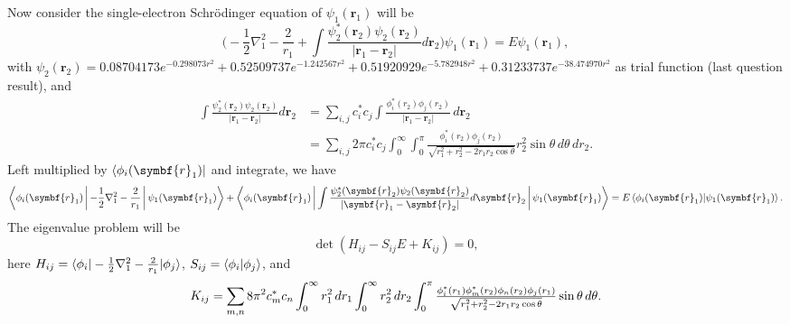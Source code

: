 \documentclass[12pt]{article}
\begin{document}
Now consider the single-electron
Schr\"{o}dinger equation of $\psi_1(\symbf{r}_1)$ will be
\begin{equation}
    \Big(- \frac{1}{2}\nabla_1^2 - \frac{2}{r_1}
    + \int \frac{\psi_2^\ast(\symbf{r}_2)\psi_2(\symbf{r}_2)}{\lvert \symbf{r}_1 -
        \symbf{r}_2 \rvert} d\symbf{r}_2 \Big) \psi_1(\symbf{r}_1) = E \psi_1 (\symbf{r}_1),
\end{equation}
with $\psi_2(\symbf{r}_2) = 0.08704173 e^{-0.298073 r^2}
    + 0.52509737 e^{-1.242567 r^2}
    + 0.51920929 e^{-5.782948 r^2}
    + 0.31233737 e^{-38.474970 r^2}$ as trial function (last question result),
and
\begin{equation}
    \begin{aligned}
        \int \frac{\psi_2^\ast(\symbf{r}_2)\psi_2(\symbf{r}_2)}{\lvert \symbf{r}_1 -
            \symbf{r}_2 \rvert} d\symbf{r}_2
         & = \sum_{i, j}
        c_i^\ast c_j
        \int
        \frac{\phi_i^\ast(r_2) \phi_j(r_2)}{\lvert \symbf{r}_1 - \symbf{r}_2 \rvert}
        \, d\symbf{r}_2  \\
         & = \sum_{i, j}
        2\pi c_i^\ast c_j
        \int_{0}^{\infty} \int_{0}^{\pi}
        \tfrac{\phi_i^\ast(r_2) \phi_j(r_2)}{\sqrt{r_1^2 + r_2^2 - 2 r_1 r_2
                \cos\theta}}
        r_2^2 \sin \theta \, d\theta \, dr_2.
    \end{aligned}
\end{equation}
Left multiplied by $\bra{\phi_i(\symbf{r}_1)}$ and integrate, we have
\begin{equation}
    \begin{aligned}
        \Braket{ \phi_i(\symbf{r}_1) | - \frac{1}{2}\nabla_1^2 -
            \frac{2}{r_1} | \psi_1(\symbf{r}_1) } +
        \Braket{\phi_i(\symbf{r}_1) |
            \int \frac{\psi_2^\ast(\symbf{r}_2)\psi_2(\symbf{r}_2)}{\lvert
                \symbf{r}_1 - \symbf{r}_2 \rvert} d\symbf{r}_2 | \psi_1(\symbf{r}_1)}
        = E \braket{\phi_i(\symbf{r}_1) |
            \psi_1(\symbf{r}_1)}.
    \end{aligned}
\end{equation}
The eigenvalue problem will be
\begin{equation}
    \det (H_{ij} - S_{ij} E + K_{ij}) = 0,
\end{equation}
here $H_{ij} = \braket{\phi_i | - \frac{1}{2}\nabla_1^2 - \frac{2}{r_1} | \phi_j}$, $S_{ij} =
    \braket{\phi_i | \phi_j}$, and
\begin{equation}
    K_{ij} = \sum_{m, n} 8\pi^2 c_m^\ast c_n
    \int_{0}^{\infty} r_1^2  \, dr_1
    \int_{0}^{\infty} r_2^2 \, dr_2
    \int_{0}^{\pi}
    \tfrac{\phi_i^\ast(r_1) \phi_m^\ast(r_2) \phi_n(r_2)\phi_j(r_1)}{%
        \sqrt{r_1^2 + r_2^2 - 2 r_1 r_2 \cos\theta}} \sin\theta \, d\theta.
\end{equation}
\end{document}
